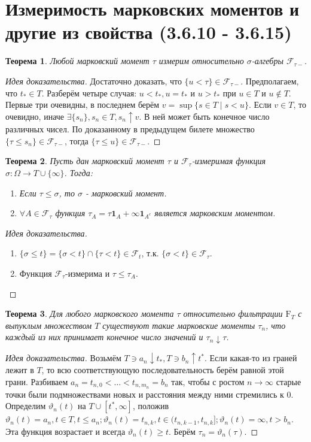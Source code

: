 \documentclass[16pt]{article}
\newtheorem{theorem}{Теорема}[section]
\theoremstyle{definition}
\begin{document}
\section{Измеримость марковских моментов и другие из свойства (3.6.10 - 3.6.15)}
\begin{theorem}
Любой марковский момент $\tau$ измерим относительно $\sigma$-алгебры $\mathcal{F}_{\tau-}$.
\end{theorem}
\begin{proof}[Идея доказательства]
Достаточно доказать, что $\{u < \tau\} \in \mathcal{F}_{\tau-}$. Предполагаем, что $t_* \in T$. Разберём четыре случая: $u < t_*, u = t_*$ и $u > t_*$ при $u \in T$ и $u \notin T$. Первые три очевидны, в последнем берём $v = \sup\{s \in T \mid s < u\}$. Если $v \in T$, то очевидно, иначе $\exists \{s_n\}, s_n \in T, s_n \uparrow v$. В ней может быть конечное число различных чисел. По доказанному в предыдущем билете множество $\{\tau \le s_n\} \in \mathcal{F}_{\tau-}$, тогда $\{\tau \le u\} \in \mathcal{F}_{\tau-}$.
\end{proof}
\begin{theorem}
Пусть дан марковский момент $\tau$ и $\mathcal{F}_\tau$-измеримая функция $\sigma: \Omega \rightarrow T \cup \{\infty\}$. Тогда:
\begin{enumerate}
    \item Если $\tau \le \sigma$, то $\sigma$ - марковский момент.
    \item $\forall A \in \mathcal{F}_\tau$ функция $\tau_A = \tau\mathbf{1}_A + \infty\mathbf{1}_{A^c}$ является марковским моментом.
\end{enumerate}
\end{theorem}
\begin{proof}[Идея доказательства]
\begin{enumerate}
    \item $\{\sigma \le t\} = \{\sigma < t\} \cap \{\tau < t\} \in \mathcal{F}_t$, т.к. $\{\sigma < t\} \in \mathcal{F}_\tau$.
    \item Функция $\mathcal{F}_\tau$-измерима и $\tau \le \tau_A$.
\end{enumerate}
\end{proof}
\begin{theorem}
Для любого марковского момента $\tau$ относительно фильтрации $\mathrm{F}_T$ с выпуклым множеством $T$ существуют такие марковские моменты $\tau_n$, что каждый из них принимает конечное число значений и $\tau_n \downarrow \tau$.
\end{theorem}
\begin{proof}[Идея доказательства]
Возьмём $T \ni a_n \downarrow t_*, T \ni b_n \uparrow t^*$. Если какая-то из граней лежит в $T$, то всю соответствующую последовательность берём равной этой грани. \newline Разбиваем $a_n = t_{n, 0} < \ldots < t_{n, m_n} = b_n$ так, чтобы с ростом $n \rightarrow \infty$ старые точки были подмножествами новых и расстояния между ними стремились к $0$. Определим $\vartheta_n(t)$ на $T \cup [t^*, \infty]$, положив $\vartheta_n(t) = a_n, t \in T, t \le a_n; \vartheta_n(t) = t_{n,k}, t \in (t_{n, k-1}, t_{n, k}]; \vartheta_n(t) = \infty, t > b_n$. Эта функция возрастает и всегда $\vartheta_n(t) \ge t$. Берём $\tau_n = \vartheta_n(\tau)$.
\end{proof}
\end{document}
